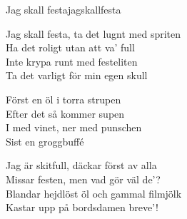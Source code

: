 \begin{song}{Jag skall festa}{jagskallfesta}

\begin{vers}
Jag skall festa, ta det lugnt med spriten\\
Ha det roligt utan att va' full\\
Inte krypa runt med festeliten\\
Ta det varligt för min egen skull\\
\end{vers}
\begin{vers}
Först en öl i torra strupen\\
Efter det så kommer supen\\
I med vinet, ner med punschen\\
Sist en groggbuffé\\
\end{vers}
\begin{vers}
Jag är skitfull, däckar först av alla\\
Missar festen, men vad gör väl de'?\\
Blandar hejdlöst öl och gammal filmjölk\\
Kastar upp på bordsdamen breve'!\\
\end{vers}
\end{song}

